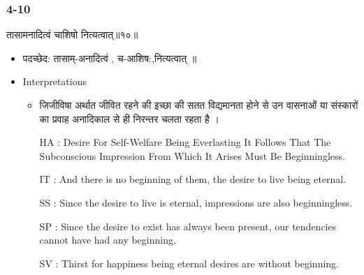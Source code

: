 \begin{frame}[fragile]\frametitle{4-10}
\begin{sanskrit}
तासामनादित्वं चाशिषो नित्यत्वात्॥१०॥
\end{sanskrit}

	\begin{itemize}
	\item पदच्छेद:  तासाम्-अनादित्वं , च-आशिष:,‌नित्यत्वात् ॥
	\item Interpretations
		\begin{itemize}	
		\item जिजीविषा अर्थात जीवित रहने की इच्छा की सतत विद्यमानता होने से उन वासनाओं या संस्कारों का प्रवाह अनादिकाल से ही निरन्तर चलता रहता है ।
		\item [HA]: Desire For Self-Welfare Being Everlasting It Follows That The Subconscious Impression From Which It Arises Must Be Beginningless.
		\item [IT]: And there is no beginning of them, the desire to live being eternal.
		\item [SS]: Since the desire to live is eternal, impressions are also beginningless.
		\item [SP]: Since the desire to exist has always been present, our tendencies cannot have had any beginning.
		\item [SV]: Thirst for happiness being eternal desires are without beginning. 
		\end{itemize}
	\end{itemize}
\end{frame}

